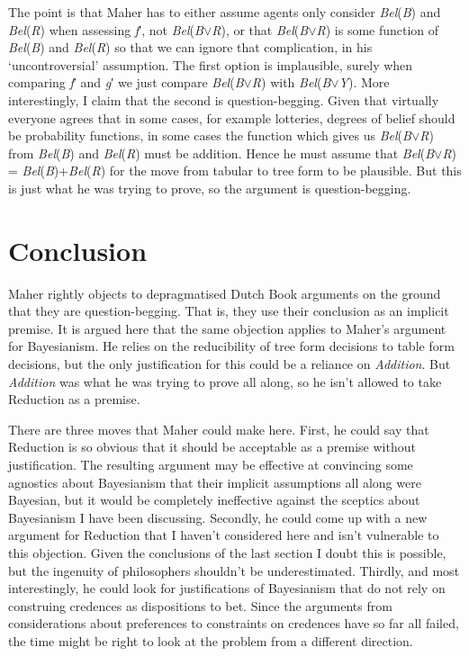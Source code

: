 \documentclass[
  10pt,
  letterpaper,
  DIV=11,
  numbers=noendperiod,
  twoside]{scrartcl}
\begin{document}
The point is that Maher has to either assume agents only consider
\emph{Bel}(\emph{B}) and \emph{Bel}(\emph{R}) when assessing \emph{f}′,
not \emph{Bel}(\emph{B}\({\vee}\)\emph{R}), or that
\emph{Bel}(\emph{B}\({\vee}\)\emph{R}) is some function of
\emph{Bel}(\emph{B}) and \emph{Bel}(\emph{R}) so that we can ignore that
complication, in his `uncontroversial' assumption. The first option is
implausible, surely when comparing \emph{f}′ and \emph{g}′ we just
compare \emph{Bel}(\emph{B}\({\vee}\)\emph{R}) with
\emph{Bel}(\emph{B}\({\vee}\)\emph{Y}). More interestingly, I claim that
the second is question-begging. Given that virtually everyone agrees
that in some cases, for example lotteries, degrees of belief should be
probability functions, in some cases the function which gives us
\emph{Bel}(\emph{B}\({\vee}\)\emph{R}) from \emph{Bel}(\emph{B}) and
\emph{Bel}(\emph{R}) must be addition. Hence he must assume that
\emph{Bel}(\emph{B}\({\vee}\)\emph{R}) =
\emph{Bel}(\emph{B})+\emph{Bel}(\emph{R}) for the move from tabular to
tree form to be plausible. But this is just what he was trying to prove,
so the argument is question-begging.

\section{Conclusion}\label{conclusion}

Maher rightly objects to depragmatised Dutch Book arguments on the
ground that they are question-begging. That is, they use their
conclusion as an implicit premise. It is argued here that the same
objection applies to Maher's argument for Bayesianism. He relies on the
reducibility of tree form decisions to table form decisions, but the
only justification for this could be a reliance on \emph{Addition}. But
\emph{Addition} was what he was trying to prove all along, so he isn't
allowed to take Reduction as a premise.

There are three moves that Maher could make here. First, he could say
that Reduction is so obvious that it should be acceptable as a premise
without justification. The resulting argument may be effective at
convincing some agnostics about Bayesianism that their implicit
assumptions all along were Bayesian, but it would be completely
ineffective against the sceptics about Bayesianism I have been
discussing. Secondly, he could come up with a new argument for Reduction
that I haven't considered here and isn't vulnerable to this objection.
Given the conclusions of the last section I doubt this is possible, but
the ingenuity of philosophers shouldn't be underestimated. Thirdly, and
most interestingly, he could look for justifications of Bayesianism that
do not rely on construing credences as dispositions to bet. Since the
arguments from considerations about preferences to constraints on
credences have so far all failed, the time might be right to look at the
problem from a different direction.
\end{document}
